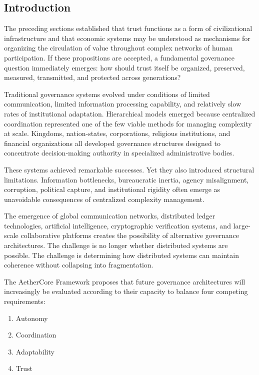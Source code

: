 \documentclass[12pt]{article}
\begin{document}
\subsection{Introduction}

The preceding sections established that trust functions as a form of civilizational infrastructure and that economic systems may be understood as mechanisms for organizing the circulation of value throughout complex networks of human participation. If these propositions are accepted, a fundamental governance question immediately emerges: how should trust itself be organized, preserved, measured, transmitted, and protected across generations?

Traditional governance systems evolved under conditions of limited communication, limited information processing capability, and relatively slow rates of institutional adaptation. Hierarchical models emerged because centralized coordination represented one of the few viable methods for managing complexity at scale. Kingdoms, nation-states, corporations, religious institutions, and financial organizations all developed governance structures designed to concentrate decision-making authority in specialized administrative bodies.

These systems achieved remarkable successes. Yet they also introduced structural limitations. Information bottlenecks, bureaucratic inertia, agency misalignment, corruption, political capture, and institutional rigidity often emerge as unavoidable consequences of centralized complexity management.

The emergence of global communication networks, distributed ledger technologies, artificial intelligence, cryptographic verification systems, and large-scale collaborative platforms creates the possibility of alternative governance architectures. The challenge is no longer whether distributed systems are possible. The challenge is determining how distributed systems can maintain coherence without collapsing into fragmentation.

The AetherCore Framework proposes that future governance architectures will increasingly be evaluated according to their capacity to balance four competing requirements:

\begin{enumerate}
  \item Autonomy
  \item Coordination
  \item Adaptability
  \item Trust
\end{enumerate}
\end{document}
